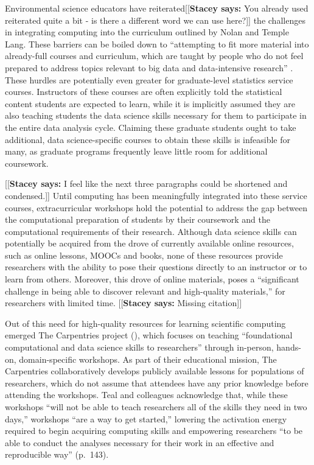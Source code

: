 \documentclass[12pt]{article}
\newcommand{\stacey}[1]{{\color{purple}[[\textbf{Stacey says: }#1]]}}
\begin{document}
\quad Environmental science educators have reiterated\stacey{You already used reiterated
quite a bit - is there a different word we can use here?} the challenges in 
integrating computing into the curriculum outlined by Nolan and Temple Lang. 
These barriers can be boiled down to ``attempting to fit more material into
already-full courses and curriculum, which are taught by people who do not feel
prepared to address topics relevant to big data and data-intensive research'' 
\citep[p.\ 547]{hampton}. These hurdles are potentially even greater for 
graduate-level statistics service courses. Instructors of these courses are 
often explicitly told the statistical content students are expected to learn, 
while it is implicitly assumed they are also teaching students the data science
skills necessary for them to participate in the entire data analysis cycle.
Claiming these graduate students ought to take additional, data science-specific
courses to obtain these skills is infeasible for many, as graduate programs
frequently leave little room for additional coursework. 

\stacey{I feel like the next three paragraphs could be shortened and condensed.}
\quad Until computing has been meaningfully integrated into these service 
courses, extracurricular workshops hold the potential to address the gap between
the computational preparation of students by their coursework and the 
computational requirements of their research. Although data science skills can 
potentially be acquired from the drove of currently available online resources, 
such as online lessons, MOOCs and books, none of these resources provide
researchers with the ability to pose their questions directly to an instructor
or to learn from others. Moreover, this drove of online materials, poses a  
``significant challenge in being able to discover relevant and high-quality
materials,'' for researchers with limited time. \stacey{Missing citation}

\quad Out of this need for high-quality
resources for learning scientific computing emerged The Carpentries project
(\citeyear{carpentries}), which focuses on teaching ``foundational
computational and data science skills to researchers'' through in-person,
hands-on, domain-specific workshops. As part of their educational mission,
The Carpentries collaboratively develops publicly available lessons for
populations of researchers, which do not assume that attendees have any prior
knowledge before attending the workshops. Teal and colleagues acknowledge that,
while these workshops ``will not be able to teach researchers all of the skills
they need in two days,'' workshops ``are a way to get started,'' lowering the
activation energy required to begin acquiring computing skills and empowering
researchers ``to be able to conduct the analyses necessary for their work in an
effective and reproducible way'' (p.\ 143). 
\end{document}

